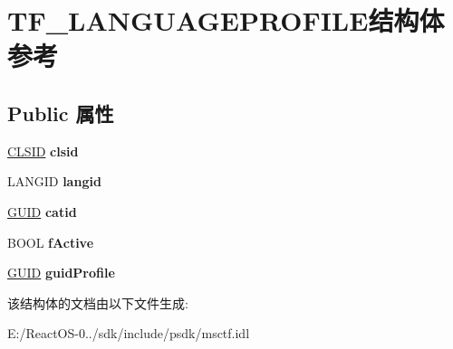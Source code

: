 \hypertarget{struct_t_f___l_a_n_g_u_a_g_e_p_r_o_f_i_l_e}{}\section{T\+F\+\_\+\+L\+A\+N\+G\+U\+A\+G\+E\+P\+R\+O\+F\+I\+L\+E结构体 参考}
\label{struct_t_f___l_a_n_g_u_a_g_e_p_r_o_f_i_l_e}
\subsection*{Public 属性}
\begin{DoxyCompactItemize}
\item 
\mbox{\label{struct_t_f___l_a_n_g_u_a_g_e_p_r_o_f_i_l_e_aa4e4328cce4a2b9ba503a9d39a79a70c}} 
\hyperlink{struct___i_i_d}{C\+L\+S\+ID} {\bfseries clsid}
\item 
\mbox{\label{struct_t_f___l_a_n_g_u_a_g_e_p_r_o_f_i_l_e_a11fc35cf6f41fdf71d14fa624367632c}} 
L\+A\+N\+G\+ID {\bfseries langid}
\item 
\mbox{\label{struct_t_f___l_a_n_g_u_a_g_e_p_r_o_f_i_l_e_a09afecc0286e6117dada368cef54c08a}} 
\hyperlink{interface_g_u_i_d}{G\+U\+ID} {\bfseries catid}
\item 
\mbox{\label{struct_t_f___l_a_n_g_u_a_g_e_p_r_o_f_i_l_e_a4307890db4b514128d9dcc1b46676520}} 
B\+O\+OL {\bfseries f\+Active}
\item 
\mbox{\label{struct_t_f___l_a_n_g_u_a_g_e_p_r_o_f_i_l_e_a2bcdbebb704789bf214bdcdea5b4bbe1}} 
\hyperlink{interface_g_u_i_d}{G\+U\+ID} {\bfseries guid\+Profile}
\end{DoxyCompactItemize}


该结构体的文档由以下文件生成\+:\begin{DoxyCompactItemize}
\item 
E\+:/\+React\+O\+S-\/0../sdk/include/psdk/msctf.\+idl\end{DoxyCompactItemize}

